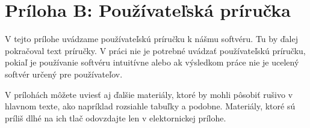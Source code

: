 \chapter*{Príloha B: Používateľská príručka}

V tejto prílohe uvádzame používateľskú príručku k nášmu softvéru. Tu
by ďalej pokračoval text príručky. V práci nie je potrebné uvádzať
používateľskú príručku, pokiaľ je používanie softvéru intuitívne
alebo ak výsledkom práce nie je ucelený softvér určený pre
používateľov.

V prílohách môžete uviesť aj ďalšie materiály, ktoré by mohli pôsobiť
rušivo v hlavnom texte, ako napríklad rozsiahle tabuľky a
podobne. Materiály, ktoré sú príliš dlhé na ich tlač odovzdajte len v
elektornickej prílohe.
